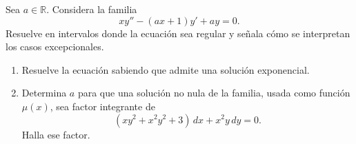 Sea \(a\in\mathbb R\). Considera la familia
\[xy''-(ax+1)y'+ay=0.\]
Resuelve en intervalos donde la ecuación sea regular y señala cómo se interpretan los casos excepcionales.

\begin{enumerate}[label=(\alph*),ref=\alph*,leftmargin=*]
\item Resuelve la ecuación sabiendo que admite una solución exponencial.
\item Determina \(a\) para que una solución no nula de la familia, usada como función \(\mu(x)\), sea factor integrante de
\[(xy^2+x^2y^2+3)\,dx+x^2y\,dy=0.\]
Halla ese factor.
\end{enumerate}
